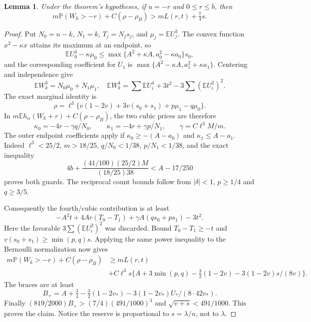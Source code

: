 \documentclass[11pt]{article}
\newtheorem{lemma}[theorem]{Lemma}
\newcommand{\E}{\mathbb E}
\newcommand{\Pp}{\mathbb P}
\begin{document}
\begin{lemma}\label{lc:joint}
Under the theorem's hypotheses, if $u=-r$ and $0\le r\le b$, then
\[
 m\Pp(W_k>-r)+C(\rho-\rho_B)>mL(r,t)+\tfrac74s.
\]
\end{lemma}
\begin{proof}
Put $N_0=n-k$, $N_1=k$, $T_j=N_js_j$, and $\mu_j=\E U_j^3$.
The convex function $x^2-\kappa x$ attains its maximum at an endpoint,
so
\[
 \E U_0^4-\kappa\mu_0\le
       \max\{A^2+\kappa A,a_0^2-\kappa a_0\}s_0,
\]
and the corresponding coefficient for $U_1$ is
$\max\{A^2-\kappa A,a_1^2+\kappa a_1\}$.
Centering and independence give
\[
 \E W_k^3=N_0\mu_0+N_1\mu_1,\quad
 \E W_k^4=\sum\E U_i^4+3t^2-3\sum(\E U_i^2)^2.
\]
The exact marginal identity is
\[
 \rho=\ell^3\{v(1-2v)+3v(s_0+s_1)+p\mu_1-q\mu_0\}.
\]
In $m\E h_\alpha(W_k+r)+C(\rho-\rho_B)$, the two cubic prices
are therefore
\[
 \kappa_0=-4r-\gamma q/N_0,\qquad
 \kappa_1=-4r+\gamma p/N_1,\qquad
 \gamma=C\ell^3M/m.
\]
The outer endpoint coefficients apply if
$\kappa_0\ge-(A-a_0)$ and $\kappa_1\le A-a_1$.
Indeed $\ell^3<25/2$, $m>18/25$, $q/N_0<1/38$, $p/N_1<1/38$,
and the exact inequality
\[
 4b+\frac{(41/100)(25/2)M}{(18/25)38}<A-17/250
\]
proves both guards. The reciprocal count bounds follow from
$|\delta|<1$, $p\ge1/4$ and $q\ge3/5$.

Consequently the fourth/cubic contribution is at least
\[
 -A^2t+4Ar(T_0-T_1)+\gamma A(qs_0+ps_1)-3t^2.
\]
Here the favorable $3\sum(\E U_i^2)^2$ was discarded. Bound
$T_0-T_1\ge-t$ and $v(s_0+s_1)\ge\min(p,q)s$. Applying the same
power inequality to the Bernoulli normalization now gives
\begin{align*}
 m\Pp(W_k>-r)+C(\rho-\rho_B)&\ge mL(r,t)\\
 &+C\ell^3s\{A+3\min(p,q)-\tfrac32(1-2v)
                         -3(1-2v)s/(8v)\}.
\end{align*}
The braces are at least
\[
 B_+=A+\tfrac34-\tfrac32(1-2v_*)-
                           3(1-2v_*)U_*/(8\cdot42v_*).
\]
Finally $(819/2000)B_+>(7/4)(491/1000)^3$ and
$\sqrt{v+s}<491/1000$. This proves the claim. Notice the reserve
is proportional to $s=\lambda/n$, not to $\lambda$.
\end{proof}
\end{document}

